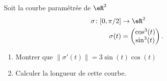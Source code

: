 
\begin{exercice}\label{exoOutilsMath-0098}

    Soit la courbe paramétrée de $\eR^2$
    \begin{equation}
        \begin{aligned}
            \sigma\colon \mathopen[ 0 , \pi/2 \mathclose]&\to \eR^2 \\
            \sigma(t)&=\begin{pmatrix}
                \cos^3(t)    \\ 
                \sin^3(t)    
            \end{pmatrix}.
        \end{aligned}
    \end{equation}
    \begin{enumerate}
        \item
            Montrer que $\| \sigma'(t) \|=3\sin(t)\cos(t)$
        \item
            Calculer la longueur de cette courbe.
    \end{enumerate}

\end{exercice}
